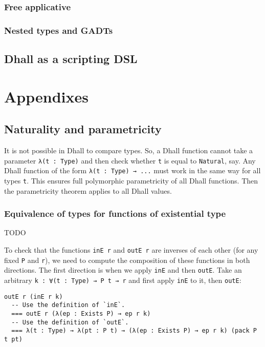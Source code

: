 \subsection{Free applicative}


\subsection{Nested types and GADTs}


\section{Dhall as a scripting DSL}


\chapter{Appendixes}


\section{Naturality and parametricity}


It is not possible in Dhall to compare types.
So, a Dhall function cannot take a parameter \lstinline!λ(t : Type)! and then check whether \lstinline!t! is equal to \lstinline!Natural!, say.
Any Dhall function of the form \lstinline!λ(t : Type) → ...! must work in the same way for all types \lstinline!t!.
This ensures full polymorphic parametricity of all Dhall functions.
Then the parametricity theorem applies to all Dhall values.


\subsection{Equivalence of types for functions of existential type}


TODO


To check that the functions \lstinline!inE r! and \lstinline!outE r! are inverses of each other (for any fixed \lstinline!P! and \lstinline!r!), we need to compute the composition of these functions in both directions.
The first direction is when we apply \lstinline!inE! and then \lstinline!outE!.
Take an arbitrary \lstinline!k : ∀(t : Type) → P t → r! and first apply \lstinline!inE! to it, then \lstinline!outE!:


\begin{lstlisting}[language=Dhall]
outE r (inE r k)
  -- Use the definition of `inE`.
  === outE r (λ(ep : Exists P) → ep r k)
  -- Use the definition of `outE`.
  === λ(t : Type) → λ(pt : P t) → (λ(ep : Exists P) → ep r k) (pack P t pt)
\end{lstlisting}


